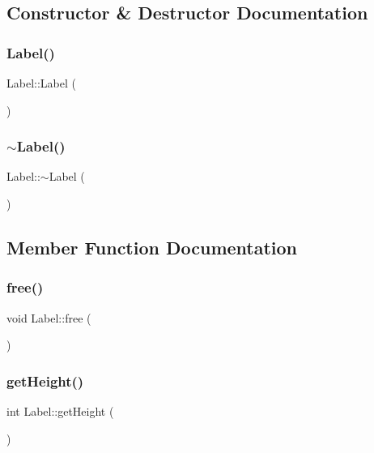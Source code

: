 \subsection{Constructor \& Destructor Documentation}
\mbox{\label{class_label_af8f2bccf9faadcb2ca964bd2347dde24}} 
\subsubsection{\texorpdfstring{Label()}{Label()}}
{\footnotesize\ttfamily Label\+::\+Label (\begin{DoxyParamCaption}{ }\end{DoxyParamCaption})}

\mbox{\label{class_label_a39e1167a9b5827afd888780973d88894}} 
\subsubsection{\texorpdfstring{$\sim$\+Label()}{~Label()}}
{\footnotesize\ttfamily Label\+::$\sim$\+Label (\begin{DoxyParamCaption}{ }\end{DoxyParamCaption})}



\subsection{Member Function Documentation}
\mbox{\label{class_label_a553b973908f7b55a8feb671e9e1905bd}} 
\subsubsection{\texorpdfstring{free()}{free()}}
{\footnotesize\ttfamily void Label\+::free (\begin{DoxyParamCaption}{ }\end{DoxyParamCaption})}

\mbox{\label{class_label_a2493f06ab82ced2ebe627556e630fa5b}} 
\subsubsection{\texorpdfstring{get\+Height()}{getHeight()}}
{\footnotesize\ttfamily int Label\+::get\+Height (\begin{DoxyParamCaption}{ }\end{DoxyParamCaption})}

